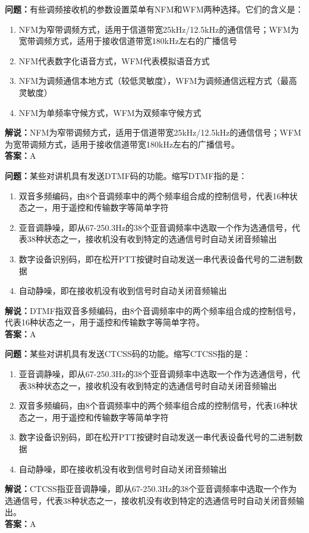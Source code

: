 \documentclass[UTF8]{ctexbook}
\begin{document}
\textbf{问题：}有些调频接收机的参数设置菜单有NFM和WFM两种选择。它们的含义是：
\begin{enumerate}[label=\Alph*), leftmargin=3em]
  \item NFM为窄带调频方式，适用于信道带宽25kHz/12.5kHz的通信信号；WFM为宽带调频方式，适用于接收信道带宽180kHz左右的广播信号
  \item NFM代表数字化语音方式，WFM代表模拟语音方式
  \item NFM为调频通信本地方式（较低灵敏度），WFM为调频通信远程方式（最高灵敏度）
  \item NFM为单频率守候方式，WFM为双频率守候方式
\end{enumerate}
\textbf{解说：}NFM为窄带调频方式，适用于信道带宽25kHz/12.5kHz的通信信号；WFM为宽带调频方式，适用于接收信道带宽180kHz左右的广播信号。\\
\textbf{答案：}A

\textbf{问题：}某些对讲机具有发送DTMF码的功能。缩写DTMF指的是：
\begin{enumerate}[label=\Alph*), leftmargin=3em]
  \item 双音多频编码，由8个音调频率中的两个频率组合成的控制信号，代表16种状态之一，用于遥控和传输数字等简单字符
  \item 亚音调静噪，即从67-250.3Hz的38个亚音调频率中选取一个作为选通信号，代表38种状态之一，接收机没有收到特定的选通信号时自动关闭音频输出
  \item 数字设备识别码，即在松开PTT按键时自动发送一串代表设备代号的二进制数据
  \item 自动静噪，即在接收机没有收到信号时自动关闭音频输出
\end{enumerate}
\textbf{解说：}DTMF指双音多频编码，由8个音调频率中的两个频率组合成的控制信号，代表16种状态之一，用于遥控和传输数字等简单字符。\\
\textbf{答案：}A

\textbf{问题：}某些对讲机具有发送CTCSS码的功能。缩写CTCSS指的是：
\begin{enumerate}[label=\Alph*), leftmargin=3em]
  \item 亚音调静噪，即从67-250.3Hz的38个亚音调频率中选取一个作为选通信号，代表38种状态之一，接收机没有收到特定的选通信号时自动关闭音频输出
  \item 双音多频编码，由8个音调频率中的两个频率组合成的控制信号，代表16种状态之一，用于遥控和传输数字等简单字符
  \item 数字设备识别码，即在松开PTT按键时自动发送一串代表设备代号的二进制数据
  \item 自动静噪，即在接收机没有收到信号时自动关闭音频输出
\end{enumerate}
\textbf{解说：}CTCSS指亚音调静噪，即从67-250.3Hz的38个亚音调频率中选取一个作为选通信号，代表38种状态之一，接收机没有收到特定的选通信号时自动关闭音频输出。\\
\textbf{答案：}A
\end{document}
